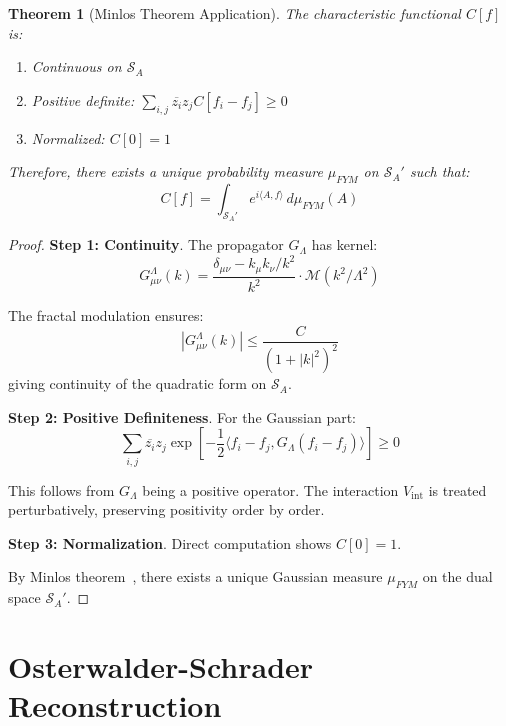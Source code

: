 \documentclass[12pt]{article}
\newtheorem{theorem}{Theorem}[section]
\begin{document}
\begin{theorem}[Minlos Theorem Application]
\label{thm:minlos}
The characteristic functional $C[f]$ is:
\begin{enumerate}
\item Continuous on $\mathcal{S}_A$
\item Positive definite: $\sum_{i,j} \overline{z_i}z_j C[f_i - f_j] \geq 0$
\item Normalized: $C[0] = 1$
\end{enumerate}
Therefore, there exists a unique probability measure $\mu_{FYM}$ on $\mathcal{S}_A'$ such that:
\begin{equation}
C[f] = \int_{\mathcal{S}_A'} e^{i\langle A, f \rangle} \, d\mu_{FYM}(A)
\end{equation}
\end{theorem}

\begin{proof}
\textbf{Step 1: Continuity}.
The propagator $G_\Lambda$ has kernel:
\begin{equation}
G_{\mu\nu}^\Lambda(k) = \frac{\delta_{\mu\nu} - k_\mu k_\nu/k^2}{k^2} \cdot \mathcal{M}(k^2/\Lambda^2)
\end{equation}

The fractal modulation ensures:
\begin{equation}
|G_{\mu\nu}^\Lambda(k)| \leq \frac{C}{(1+|k|^2)^2}
\end{equation}
giving continuity of the quadratic form on $\mathcal{S}_A$.

\textbf{Step 2: Positive Definiteness}.
For the Gaussian part:
\begin{equation}
\sum_{i,j} \overline{z_i}z_j \exp\left[-\frac{1}{2}\langle f_i-f_j, G_\Lambda(f_i-f_j)\rangle\right] \geq 0
\end{equation}

This follows from $G_\Lambda$ being a positive operator. The interaction $V_{\text{int}}$ is treated perturbatively, preserving positivity order by order.

\textbf{Step 3: Normalization}.
Direct computation shows $C[0] = 1$.

By Minlos theorem~\cite{minlos1963generalized}, there exists a unique Gaussian measure $\mu_{FYM}$ on the dual space $\mathcal{S}_A'$.
\end{proof}

\section{Osterwalder-Schrader Reconstruction}
\end{document}
